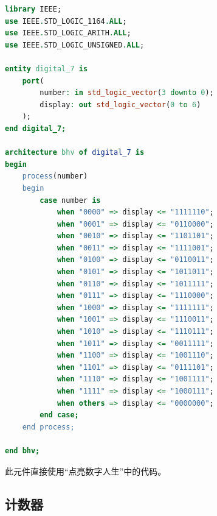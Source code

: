 \documentclass[a4paper]{article}
\begin{document}
\begin{lstlisting}[language=vhdl]
library IEEE;
use IEEE.STD_LOGIC_1164.ALL;
use IEEE.STD_LOGIC_ARITH.ALL;
use IEEE.STD_LOGIC_UNSIGNED.ALL;

entity digital_7 is
    port(
        number: in std_logic_vector(3 downto 0);
        display: out std_logic_vector(0 to 6)
    );
end digital_7;

architecture bhv of digital_7 is
begin
    process(number)
    begin
        case number is
            when "0000" => display <= "1111110";
            when "0001" => display <= "0110000";
            when "0010" => display <= "1101101";
            when "0011" => display <= "1111001";
            when "0100" => display <= "0110011";
            when "0101" => display <= "1011011";
            when "0110" => display <= "1011111";
            when "0111" => display <= "1110000";
            when "1000" => display <= "1111111";
            when "1001" => display <= "1110011";
            when "1010" => display <= "1110111";
            when "1011" => display <= "0011111";
            when "1100" => display <= "1001110";
            when "1101" => display <= "0111101";
            when "1110" => display <= "1001111";
            when "1111" => display <= "1000111";
            when others => display <= "0000000";
        end case;
    end process;

end bhv;
\end{lstlisting}

此元件直接使用“点亮数字人生”中的代码。

\subsection{计数器}
\end{document}
